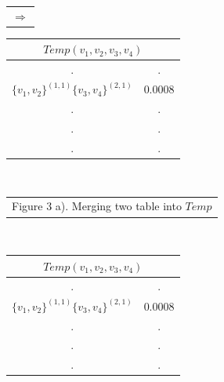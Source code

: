 \documentclass[12pt]{article}
\begin{document}
\begin{table}[!htb]
\begin{minipage}{.06\linewidth}
        \begin{tabular}{c}
     $ \Rightarrow$\\
        \end{tabular}
    \end{minipage}%
     \begin{minipage}{.3\linewidth}
      \centering
     \begin{tabular}{cc}
\multicolumn{2}{c}{$Temp(v_1,v_2,v_3,v_4)$}                           \\ \hline
\multicolumn{1}{|c}{.} & \multicolumn{1}{|c|}{.} \\ \hline
  \multicolumn{1}{|l}{$\{v_1,v_2\}^{(1,1)}\{v_3,v_4\}^{(2,1)}$} & \multicolumn{1}{|l|}{$0.0008$} \\ \hline         
                   \multicolumn{1}{|c}{.} & \multicolumn{1}{|c|}{.} \\ \hline                 
                   \multicolumn{1}{|c}{.} & \multicolumn{1}{|c|}{.} \\ \hline
                   \multicolumn{1}{|c}{.} & \multicolumn{1}{|c|}{.} \\ \hline        
\end{tabular}
    \end{minipage}\\
    \begin{minipage}{1.0\linewidth}
       \centering
 
        \begin{tabular}{c}
Figure 3 a). Merging two table into $Temp$
        \end{tabular}
    \end{minipage}\\
     \begin{minipage}{.4\linewidth}
      \centering
     \begin{tabular}{cc}
\multicolumn{2}{c}{$Temp(v_1,v_2,v_3,v_4)$}                           \\ \hline
\multicolumn{1}{|c}{.} & \multicolumn{1}{|c|}{.} \\ \hline
  \multicolumn{1}{|l}{$\{v_1,v_2\}^{(1,1)}\{v_3,v_4\}^{(2,1)}$} & \multicolumn{1}{|l|}{$0.0008$} \\ \hline         
                   \multicolumn{1}{|c}{.} & \multicolumn{1}{|c|}{.} \\ \hline                 
                   \multicolumn{1}{|c}{.} & \multicolumn{1}{|c|}{.} \\ \hline
                   \multicolumn{1}{|c}{.} & \multicolumn{1}{|c|}{.} \\ \hline        
\end{tabular}
    \end{minipage}%
     \begin{minipage}{.06\linewidth}
     

\end{minipage}
\end{table}
\end{document}
